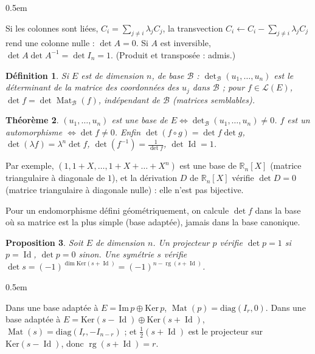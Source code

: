 \documentclass[a4paper,11pt]{article}
\makeatletter
\numberwithin{equation}{section}
\numberwithin{figure}{section}
\numberwithin{table}{section}
\theoremstyle{enonce}
\newtheorem{definition}{Définition}[section]
\newtheorem{theoreme}[definition]{Théorème}
\newtheorem{proposition}[definition]{Proposition}
\theoremstyle{exemple}
\theoremstyle{remarque}
\renewcommand{\proofname}{Démonstration}
\renewenvironment{proof}[1][\proofname]{\par\pushQED{\qed}\normalfont
  \topsep0.5em\relax\trivlist\item[\hskip\labelsep\sffamily\itshape\color{Gris}#1.]\ignorespaces}
  {\popQED\endtrivlist\@endpefalse}
\newcommand{\R}{\mathbb{R}}
\newcommand{\LE}{\mathcal{L}(E)}
\newcommand{\rg}{\operatorname{rg}}
\newcommand{\Mat}{\operatorname{Mat}}
\newcommand{\Id}{\operatorname{Id}}
\makeatother
\begin{document}
\begin{proof}
Si les colonnes sont liées, $C_i=\sum_{j\neq i}\lambda_jC_j$, la transvection $C_i\leftarrow C_i-\sum_{j\neq i}\lambda_jC_j$ rend
une colonne nulle : $\det A=0$. Si $A$ est inversible, $\det A\det A^{-1}=\det I_n=1$. (Produit et transposée : admis.)
\end{proof}

\begin{definition}
Si $E$ est de dimension $n$, de base $\mathcal B$ : $\det_{\mathcal B}(u_1,\dots,u_n)$ est le déterminant de la matrice des
coordonnées des $u_j$ dans $\mathcal B$ ; pour $f\in\LE$, $\det f=\det\Mat_{\mathcal B}(f)$, indépendant de $\mathcal B$
(matrices semblables).
\end{definition}

\begin{theoreme}\label{thm:base}
$(u_1,\dots,u_n)$ est une base de $E\iff\det_{\mathcal B}(u_1,\dots,u_n)\neq0$. $f$ est un automorphisme $\iff\det f\neq0$.
Enfin $\det(f\circ g)=\det f\det g$, $\det(\lambda f)=\lambda^n\det f$, $\det(f^{-1})=\frac1{\det f}$, $\det\Id=1$.
\end{theoreme}

Par exemple, $(1,1+X,\dots,1+X+\dots+X^n)$ est une base de $\R_n[X]$ (matrice triangulaire à diagonale de $1$), et la
dérivation $D$ de $\R_n[X]$ vérifie $\det D=0$ (matrice triangulaire à diagonale nulle) : elle n'est pas bijective.

\begin{reflexe}
Pour un endomorphisme défini géométriquement, on calcule $\det f$ dans la base où sa matrice est la plus simple (base
adaptée), jamais dans la base canonique.
\end{reflexe}

\begin{proposition}\label{prop:proj-sym}
Soit $E$ de dimension $n$. Un projecteur $p$ vérifie $\det p=1$ si $p=\Id$, $\det p=0$ sinon. Une symétrie $s$ vérifie
$\det s=(-1)^{\dim\mathrm{Ker}(s+\Id)}=(-1)^{n-\rg(s+\Id)}$.
\end{proposition}

\begin{proof}
Dans une base adaptée à $E=\mathrm{Im}\,p\oplus\mathrm{Ker}\,p$, $\Mat(p)=\mathrm{diag}(I_r,0)$. Dans une base adaptée à
$E=\mathrm{Ker}(s-\Id)\oplus\mathrm{Ker}(s+\Id)$, $\Mat(s)=\mathrm{diag}(I_r,-I_{n-r})$ ; et $\frac12(s+\Id)$ est le
projecteur sur $\mathrm{Ker}(s-\Id)$, donc $\rg(s+\Id)=r$.
\end{proof}
\end{document}
